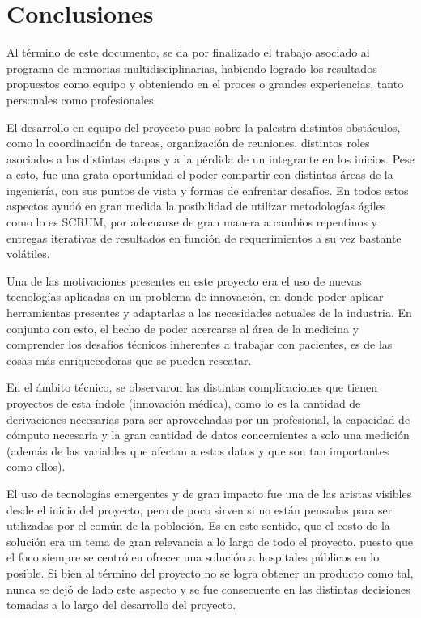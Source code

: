 \chapter{Conclusiones}\label{conclusion}

Al término de este documento, se da por finalizado el trabajo asociado al programa de memorias multidisciplinarias, habiendo logrado los resultados propuestos como equipo y obteniendo en el proces o grandes experiencias, tanto personales como profesionales.

El desarrollo en equipo del proyecto puso sobre la palestra distintos obstáculos, como la coordinación de tareas, organización de reuniones, distintos roles asociados a las distintas etapas y a la pérdida de un integrante en los inicios. Pese a esto, fue una grata oportunidad el poder compartir con distintas áreas de la ingeniería, con sus puntos de vista y formas de enfrentar desafíos. En todos estos aspectos ayudó en gran medida la posibilidad de utilizar metodologías ágiles como lo es SCRUM, por adecuarse de gran manera a cambios repentinos y entregas iterativas de resultados en función de requerimientos a su vez bastante volátiles.

Una de las motivaciones presentes en este proyecto era el uso de nuevas tecnologías aplicadas en un problema de innovación, en donde poder aplicar herramientas presentes y adaptarlas a las necesidades actuales de la industria. En conjunto con esto, el hecho de poder acercarse al área de la medicina y comprender los desafíos técnicos inherentes a trabajar con pacientes, es de las cosas más enriquecedoras que se pueden rescatar.

En el ámbito técnico, se observaron las distintas complicaciones que tienen proyectos de esta índole (innovación médica), como lo es la cantidad de derivaciones necesarias para ser aprovechadas por un profesional, la capacidad de cómputo necesaria y la gran cantidad de datos concernientes a solo una medición (además de las variables que afectan a estos datos y que son tan importantes como ellos).

\newpage

El uso de tecnologías emergentes y de gran impacto fue una de las aristas visibles desde el inicio del proyecto, pero de poco sirven si no están pensadas para ser utilizadas por el común de la población. Es en este sentido, que el costo de la solución era un tema de gran relevancia a lo largo de todo el proyecto, puesto que el foco siempre se centró en ofrecer una solución a hospitales públicos en lo posible. Si bien al término del proyecto no se logra obtener un producto como tal, nunca se dejó de lado este aspecto y se fue consecuente en las distintas decisiones tomadas a lo largo del desarrollo del proyecto.

